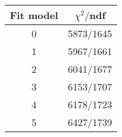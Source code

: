 \begin{tabular}{c|c}
Fit model & $\chi^2/$ndf \\
\hline
0 & 5873/1645\\
1 & 5967/1661\\
2 & 6041/1677\\
3 & 6153/1707\\
4 & 6178/1723\\
5 & 6427/1739\\
\end{tabular}
